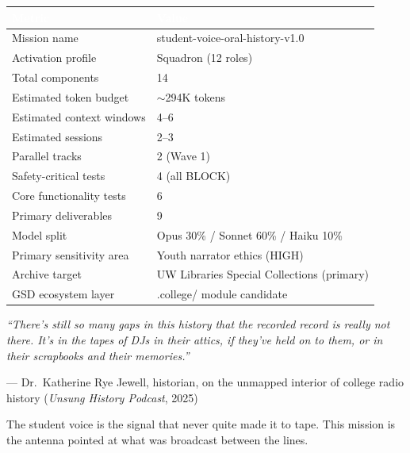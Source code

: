 \documentclass[11pt,letterpaper]{article}
\newcommand{\tableheader}[1]{\textbf{\sffamily\textcolor{white}{#1}}}
\begin{document}
\begin{center}
\begin{tabularx}{\textwidth}{L{4cm}X}
\toprule
{}
\tableheader{Metric} & \tableheader{Value} \\
\midrule
Mission name & student-voice-oral-history-v1.0 \\
Activation profile & Squadron (12 roles) \\
Total components & 14 \\
Estimated token budget & $\sim$294K tokens \\
Estimated context windows & 4--6 \\
Estimated sessions & 2--3 \\
Parallel tracks & 2 (Wave 1) \\
Safety-critical tests & 4 (all BLOCK) \\
Core functionality tests & 6 \\
Primary deliverables & 9 \\
Model split & Opus 30\% / Sonnet 60\% / Haiku 10\% \\
Primary sensitivity area & Youth narrator ethics (HIGH) \\
Archive target & UW Libraries Special Collections (primary) \\
GSD ecosystem layer & .college/ module candidate \\
\bottomrule
\end{tabularx}
\end{center}

\vspace{2em}

\begin{quotebox}
\textit{``There's still so many gaps in this history that the recorded record is really not there. It's in the tapes of DJs in their attics, if they've held on to them, or in their scrapbooks and their memories.''}

\vspace{0.5em}
--- Dr.\ Katherine Rye Jewell, historian, on the unmapped interior of college radio history (\textit{Unsung History Podcast}, 2025)

\vspace{1em}
The student voice is the signal that never quite made it to tape. This mission is the antenna pointed at what was broadcast between the lines.
\end{quotebox}
\end{document}
